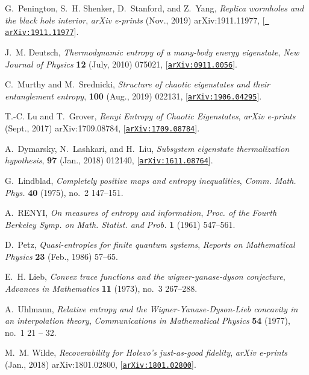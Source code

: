 \documentclass[a4paper,11pt]{article}
\newcommand{\pre}{\text{Physical Review E}}
\begin{document}
\begin{thebibliography}{100}
G.~{Penington}, S.~H. {Shenker}, D.~{Stanford}, and Z.~{Yang}, {\it {Replica
  wormholes and the black hole interior}},  {\em arXiv e-prints} (Nov., 2019)
  arXiv:1911.11977, [\href{http://arxiv.org/abs/1911.11977}{{\tt
  arXiv:1911.11977}}].

J.~M. {Deutsch}, {\it {Thermodynamic entropy of a many-body energy
  eigenstate}},  {\em New Journal of Physics} {\bf 12} (July, 2010) 075021,
  [\href{http://arxiv.org/abs/0911.0056}{{\tt arXiv:0911.0056}}].

C.~{Murthy} and M.~{Srednicki}, {\it {Structure of chaotic eigenstates and
  their entanglement entropy}},  {\em \pre} {\bf 100} (Aug., 2019) 022131,
  [\href{http://arxiv.org/abs/1906.04295}{{\tt arXiv:1906.04295}}].

T.-C. {Lu} and T.~{Grover}, {\it {Renyi Entropy of Chaotic Eigenstates}},  {\em
  arXiv e-prints} (Sept., 2017) arXiv:1709.08784,
  [\href{http://arxiv.org/abs/1709.08784}{{\tt arXiv:1709.08784}}].

A.~{Dymarsky}, N.~{Lashkari}, and H.~{Liu}, {\it {Subsystem eigenstate
  thermalization hypothesis}},  {\em \pre} {\bf 97} (Jan., 2018) 012140,
  [\href{http://arxiv.org/abs/1611.08764}{{\tt arXiv:1611.08764}}].

G.~Lindblad, {\it Completely positive maps and entropy inequalities},  {\em
  Comm. Math. Phys.} {\bf 40} (1975), no.~2 147--151.

A.~RENYI, {\it On measures of entropy and information},  {\em Proc. of the
  Fourth Berkeley Symp. on Math. Statist. and Prob.} {\bf 1} (1961) 547--561.

D.~{Petz}, {\it {Quasi-entropies for finite quantum systems}},  {\em Reports on
  Mathematical Physics} {\bf 23} (Feb., 1986) 57--65.

E.~H. Lieb, {\it Convex trace functions and the wigner-yanase-dyson
  conjecture},  {\em Advances in Mathematics} {\bf 11} (1973), no.~3 267--288.

A.~Uhlmann, {\it {Relative entropy and the Wigner-Yanase-Dyson-Lieb concavity
  in an interpolation theory}},  {\em Communications in Mathematical Physics}
  {\bf 54} (1977), no.~1 21 -- 32.

M.~M. {Wilde}, {\it {Recoverability for Holevo's just-as-good fidelity}},  {\em
  arXiv e-prints} (Jan., 2018) arXiv:1801.02800,
  [\href{http://arxiv.org/abs/1801.02800}{{\tt arXiv:1801.02800}}].


\end{thebibliography}
\end{document}
